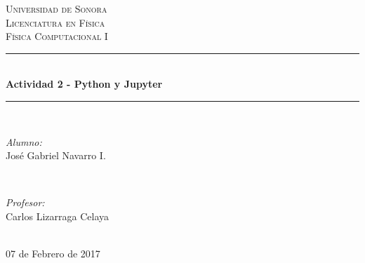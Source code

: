 \documentclass[12pt]{article}
\begin{document}
\begin{titlepage}

\newcommand{\HRule}{\rule{\linewidth}{0.5mm}} %

\center 

\textsc{\LARGE Universidad de Sonora}\\[1.5cm]
\textsc{\Large Licenciatura en Física}\\[0.5cm]
\textsc{\large Física Computacional I}\\[0.5cm]


\HRule \\[0.4cm]
{\huge \bfseries Actividad 2 - Python y Jupyter}\\[0.4cm] %
\HRule \\[1.5cm]
 

\begin{minipage}{0.4\textwidth}
\begin{flushleft} \large
\emph{Alumno:}\\
José Gabriel Navarro I.
\end{flushleft}
\end{minipage}
~
\begin{minipage}{0.4\textwidth}
\begin{flushright} \large
\emph{Profesor:} \\
Carlos Lizarraga Celaya
\end{flushright}
\end{minipage}\\[2cm]


07 de Febrero de 2017



\end{titlepage}
\end{document}
